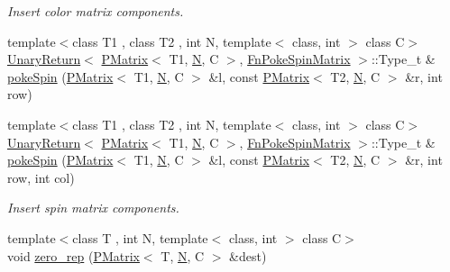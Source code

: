 \begin{DoxyCompactItemize}
\begin{DoxyCompactList}\small\item\em Insert color matrix components. \end{DoxyCompactList}\item 
{\footnotesize template$<$class T1 , class T2 , int N, template$<$ class, int $>$ class C$>$ }\\\mbox{\hyperlink{structENSEM_1_1UnaryReturn}{Unary\+Return}}$<$ \mbox{\hyperlink{classENSEM_1_1PMatrix}{P\+Matrix}}$<$ T1, \mbox{\hyperlink{operator__name__util_8cc_a7722c8ecbb62d99aee7ce68b1752f337}{N}}, C $>$, \mbox{\hyperlink{structENSEM_1_1FnPokeSpinMatrix}{Fn\+Poke\+Spin\+Matrix}} $>$\+::Type\+\_\+t \& \mbox{\hyperlink{group__primmatrix_ga738f0f1d3bad8770111452c72714a4ae}{poke\+Spin}} (\mbox{\hyperlink{classENSEM_1_1PMatrix}{P\+Matrix}}$<$ T1, \mbox{\hyperlink{operator__name__util_8cc_a7722c8ecbb62d99aee7ce68b1752f337}{N}}, C $>$ \&l, const \mbox{\hyperlink{classENSEM_1_1PMatrix}{P\+Matrix}}$<$ T2, \mbox{\hyperlink{operator__name__util_8cc_a7722c8ecbb62d99aee7ce68b1752f337}{N}}, C $>$ \&r, int row)
\item 
{\footnotesize template$<$class T1 , class T2 , int N, template$<$ class, int $>$ class C$>$ }\\\mbox{\hyperlink{structENSEM_1_1UnaryReturn}{Unary\+Return}}$<$ \mbox{\hyperlink{classENSEM_1_1PMatrix}{P\+Matrix}}$<$ T1, \mbox{\hyperlink{operator__name__util_8cc_a7722c8ecbb62d99aee7ce68b1752f337}{N}}, C $>$, \mbox{\hyperlink{structENSEM_1_1FnPokeSpinMatrix}{Fn\+Poke\+Spin\+Matrix}} $>$\+::Type\+\_\+t \& \mbox{\hyperlink{group__primmatrix_gaf6f04aa80d2490f962a3132eb16fa98a}{poke\+Spin}} (\mbox{\hyperlink{classENSEM_1_1PMatrix}{P\+Matrix}}$<$ T1, \mbox{\hyperlink{operator__name__util_8cc_a7722c8ecbb62d99aee7ce68b1752f337}{N}}, C $>$ \&l, const \mbox{\hyperlink{classENSEM_1_1PMatrix}{P\+Matrix}}$<$ T2, \mbox{\hyperlink{operator__name__util_8cc_a7722c8ecbb62d99aee7ce68b1752f337}{N}}, C $>$ \&r, int row, int col)
\begin{DoxyCompactList}\small\item\em Insert spin matrix components. \end{DoxyCompactList}\item 
{\footnotesize template$<$class T , int N, template$<$ class, int $>$ class C$>$ }\\void \mbox{\hyperlink{group__primmatrix_gab1edf71028dd684730e061dcc75b5b83}{zero\+\_\+rep}} (\mbox{\hyperlink{classENSEM_1_1PMatrix}{P\+Matrix}}$<$ T, \mbox{\hyperlink{operator__name__util_8cc_a7722c8ecbb62d99aee7ce68b1752f337}{N}}, C $>$ \&dest)

\end{DoxyCompactItemize}

